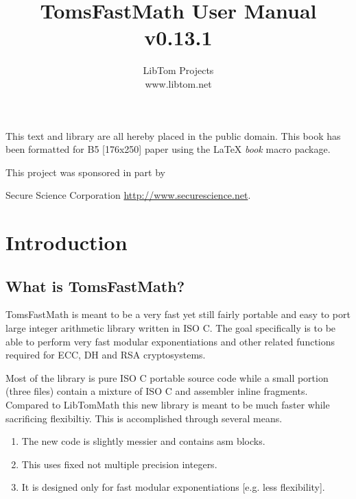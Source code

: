 \documentclass[b5paper]{book}
\begin{document}
\frontmatter
\pagestyle{empty}
\title{TomsFastMath User Manual \\ v0.13.1}
\author{LibTom Projects \\ www.libtom.net}
\maketitle
This text and library are all hereby placed in the public domain.  This book has been formatted for B5 
[176x250] paper using the \LaTeX{} {\em book} macro package.

\vspace{13cm}

\begin{flushleft}This project was sponsored in part by  

Secure Science Corporation \url{http://www.securescience.net}.
\end{flushleft}

\tableofcontents
\listoffigures
\mainmatter
\pagestyle{headings}
\chapter{Introduction}
\section{What is TomsFastMath?}

TomsFastMath is meant to be a very fast yet still fairly portable and easy to port large
integer arithmetic library written in ISO C.  The goal specifically is to be able to perform
very fast modular exponentiations and other related functions required for ECC, DH and RSA
cryptosystems.

Most of the library is pure ISO C portable source code while a small portion (three files) contain
a mixture of ISO C and assembler inline fragments.  Compared to LibTomMath this new library is 
meant to be much faster while sacrificing flexibiltiy.  This is accomplished through several means.

\begin{enumerate}
   \item The new code is slightly messier and contains asm blocks.
   \item This uses fixed not multiple precision integers.  
   \item It is designed only for fast modular exponentiations [e.g. less flexibility].
\end{enumerate}
\end{document}
